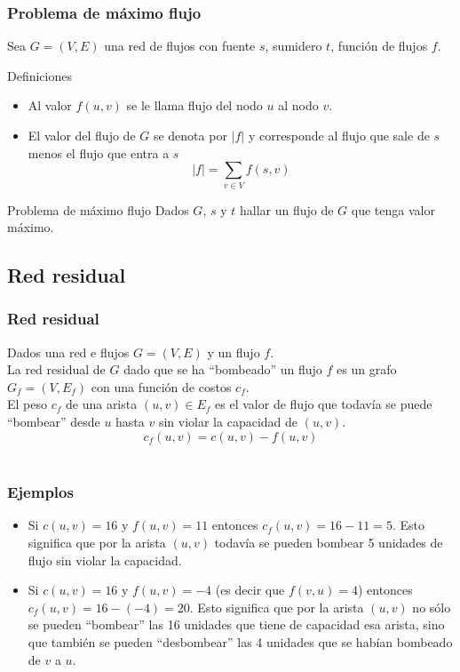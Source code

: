 \documentclass{beamer}
\begin{document}
		\begin{frame}
			\frametitle{Problema de máximo flujo}
			Sea $G = (V, E)$ una red de flujos con fuente $s$, sumidero $t$, función de flujos $f$.
			\begin{block}{Definiciones}
				\begin{itemize}
					\item Al valor $f(u,v)$ se le llama flujo del nodo $u$ al nodo $v$.
					\item El valor del flujo de $G$ se denota por $|f|$ y corresponde al flujo que sale de $s$ menos el flujo que entra a $s$ $$|f| = \displaystyle\sum_{v\in V}{f(s,v)}$$
				\end{itemize}
			\end{block}
		
			\begin{block}{Problema de máximo flujo}
				Dados $G$, $s$ y $t$ hallar un flujo de $G$ que tenga valor máximo.
			\end{block}
		\end{frame}
	
	\subsection{Red residual}
		\begin{frame}
			\frametitle{Red residual}
			Dados una red e flujos $G = (V, E)$ y un flujo $f$.\\
			La red residual de $G$ dado que se ha ``bombeado'' un flujo $f$ es un grafo $G_f = (V, E_f)$ con una función de costos $c_f$.\\ 
			El peso $c_f$ de una arista $(u, v) \in E_f$ es el valor de flujo que todavía se puede ``bombear'' desde $u$ hasta $v$ sin violar la capacidad de $(u, v)$.\\
			$$c_f(u,v) = c(u,v) - f(u,v)$$\\
		\end{frame}
	
		\begin{frame}
			\frametitle{Ejemplos}
			\begin{itemize}
				\item Si $c(u,v) = 16$ y $f(u,v) = 11$ entonces $c_f(u,v) = 16 - 11 = 5$. Esto significa que por la arista $(u,v)$ todavía se pueden bombear 5 unidades de flujo sin violar la capacidad.
				\item Si $c(u,v) = 16$ y $f(u,v) = -4$ (es decir que $f(v, u) = 4$) entonces $c_f(u,v) = 16 - (-4) = 20$. Esto significa que por la arista $(u,v)$ no sólo se pueden ``bombear'' las 16 unidades que tiene de capacidad esa arista, sino que también se pueden ``desbombear'' las 4 unidades que se habían bombeado de $v$ a $u$.
			\end{itemize}
		\end{frame}
	
\end{document}
